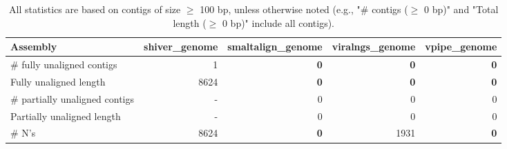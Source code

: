 \documentclass[12pt,a4paper]{article}
\begin{document}
\begin{table}[ht]
\begin{center}
\caption{All statistics are based on contigs of size $\geq$ 100 bp, unless otherwise noted (e.g., "\# contigs ($\geq$ 0 bp)" and "Total length ($\geq$ 0 bp)" include all contigs).}
\begin{tabular}{|l*{4}{|r}|}
\hline
Assembly & shiver\_genome & smaltalign\_genome & viralngs\_genome & vpipe\_genome \\ \hline
\# fully unaligned contigs & 1 & {\bf 0} & {\bf 0} & {\bf 0} \\ \hline
Fully unaligned length & 8624 & {\bf 0} & {\bf 0} & {\bf 0} \\ \hline
\# partially unaligned contigs & - & 0 & 0 & 0 \\ \hline
Partially unaligned length & - & 0 & 0 & 0 \\ \hline
\# N's & 8624 & {\bf 0} & 1931 & {\bf 0} \\ \hline
\end{tabular}
\end{center}
\end{table}
\end{document}
